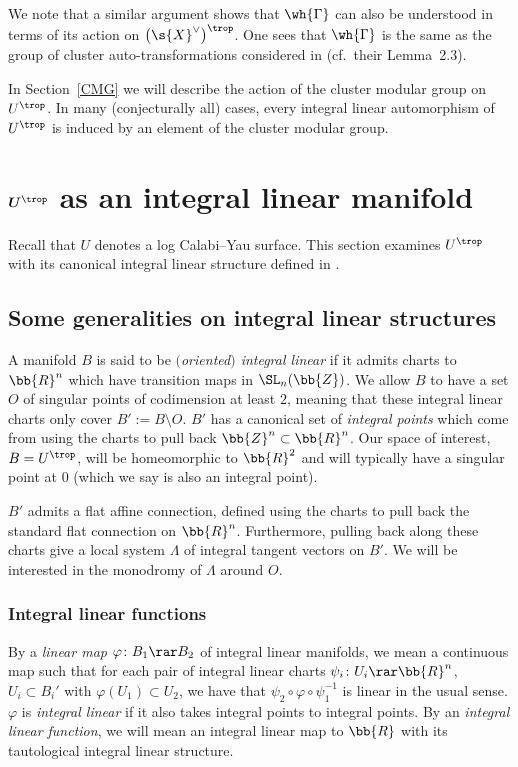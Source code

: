 We note that a similar argument shows that $\wh{\Gamma}$ can also be understood in terms of its action on $\big(\s{X}^{\vee}\big)^{\trop}$. One sees that $\wh{\Gamma}$ is the same as the group of cluster auto-transformations considered in \cite{ASS} (cf.\ their Lemma~2.3).

In Section~\ref{CMG} we will describe the action of the cluster modular group on $U^{\trop}$. In many (conjecturally all) cases, every integral linear automorphism of $U^{\trop}$ is induced by an element of the cluster modular group.

\section[$U^{\trop}$ as an integral linear manifold]{$\boldsymbol{U^{\trop}}$ as an integral linear manifold} \label{tropu}
Recall that $U$ denotes a log Calabi--Yau surface. This section examines $U^{\trop}$ with its canonical integral linear structure defined in \cite{GHK1}.

\subsection{Some generalities on integral linear structures} \label{ils}

A manifold $B$ is said to be {\it $($oriented$)$ integral linear} if it admits charts to $\bb{R}^n$ which have transition maps in $\SL_n(\bb{Z})$. We allow $B$ to have a set $O$ of singular points of codimension at least $2$, meaning that these integral linear charts only cover $B':=B\setminus O$. $B'$ has a canonical set of {\it integral points} which come from using the charts to pull back $\bb{Z}^n\subset \bb{R}^n$. Our space of interest, $B=U^{\trop}$, will be homeomorphic to $\bb{R}^2$ and will typically have a singular point at $0$ (which we say is also an integral point).

$B'$ admits a flat affine connection, defined using the charts to pull back the standard flat connection on $\bb{R}^n$. Furthermore, pulling back along these charts give a local system $\Lambda$ of integral tangent vectors on $B'$. We will be interested in the monodromy of $\Lambda$ around $O$.

\subsubsection{Integral linear functions}\label{int lin fun}

By a {\it linear map} $\varphi\colon B_1\rar B_2$ of integral linear manifolds, we mean a continuous map such that for each pair of integral linear charts $\psi_i\colon U_i\rar \bb{R}^n$, $U_i\subset B_i'$ with $\varphi(U_1)\subset U_2$, we have that $\psi_2\circ \varphi\circ \psi_1^{-1}$ is linear in the usual sense. $\varphi$ is {\it integral linear} if it also takes integral points to integral points. By an {\it integral linear function}, we will mean an integral linear map to $\bb{R}$ with its tautological integral linear structure.

